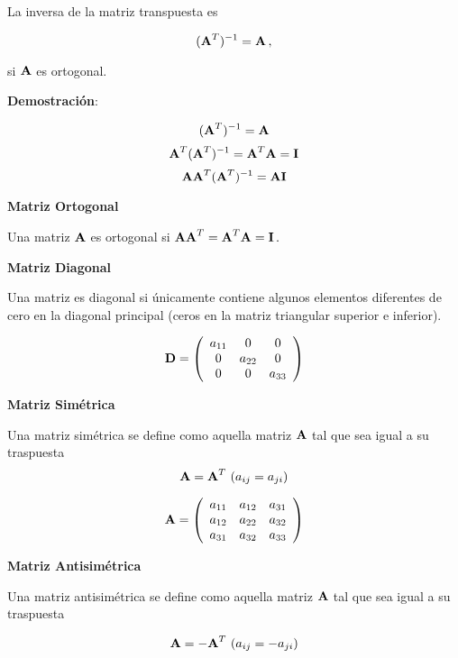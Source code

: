 \documentclass[
]{agujournal2019}
\begin{document}
La inversa de la matriz transpuesta es

\[({\textbf A}^T)^{-1}={\textbf A}\,,\]

si \({\textbf A}\) es ortogonal. ~

\textbf{Demostración}:

\[({\textbf A}^T)^{-1}={\textbf A}\]
\[{\textbf A}^T({\textbf A}^T)^{-1}={\textbf A}^T{\textbf A}={\textbf I}\]
\[{\textbf A}{\textbf A}^T({\textbf A}^T)^{-1}={\textbf A}{\textbf I}\]

\vspace{0.5cm}

\textbf{Matriz Ortogonal}

Una matriz \({\textbf A}\) es ortogonal si
\({\textbf A}{\textbf A}^T={\textbf A}^T{\textbf A}={\textbf I}\,.\)

\vspace{0.5cm}

\textbf{Matriz Diagonal}

Una matriz es diagonal si únicamente contiene algunos elementos
diferentes de cero en la diagonal principal (ceros en la matriz
triangular superior e inferior).

\[{\textbf D}=\left(\begin{array}{ccc}
  a_{11} & 0 & 0\\
  0 & a_{22} & 0\\
  0 & 0 & a_{33}
\end{array}\right) \]

\vspace{0.5cm}

\textbf{Matriz Simétrica}

Una matriz simétrica se define como aquella matriz \({\textbf A}\) tal
que sea igual a su traspuesta
\[{\textbf A}={\textbf A}^T\,\,(a_{ij}=a_{ji})\]

\[{\textbf A}=\left(\begin{array}{cccc}
  a_{11} & a_{12} & a_{31}\\
  a_{12} & a_{22} & a_{32}\\
  a_{31} & a_{32} & a_{33}\\
\end{array}\right)
\]

\vspace{0.5cm}

\textbf{Matriz Antisimétrica}

Una matriz antisimétrica se define como aquella matriz \({\textbf A}\)
tal que sea igual a su traspuesta

\[{\textbf A}=-{\textbf A}^T\,\,(a_{ij}=-a_{ji})\]
\end{document}
